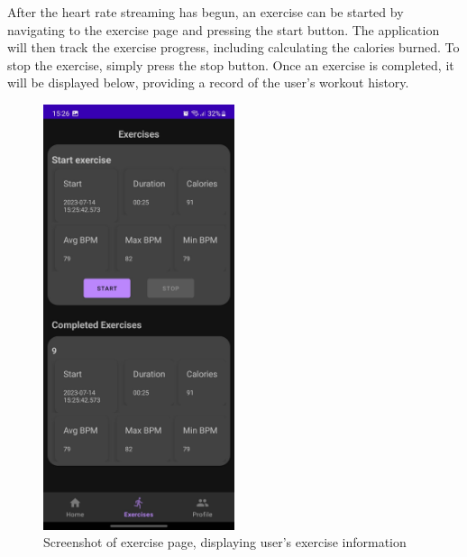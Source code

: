 After the heart rate streaming has begun, an exercise can be started by navigating to the exercise page and pressing the start button.
The application will then track the exercise progress, including calculating the calories burned. 
To stop the exercise, simply press the stop button. Once an exercise is completed, it will be displayed below, providing a record of the user's workout history.
\begin{figure}[H]
    \centering
    \includegraphics[width=0.5\textwidth]{images/exercise-tracking-sc.jpeg}
    \caption{Screenshot of exercise page, displaying user's exercise information}
    \label{fig:exercise_screenshot}
\end{figure}



